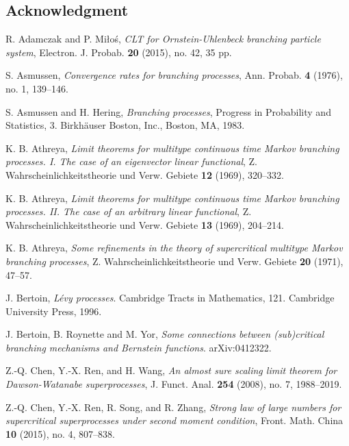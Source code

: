 \documentclass[12pt,a4paper]{amsart}
\theoremstyle{plain}
\theoremstyle{definition}
\numberwithin{equation}{section}
\begin{document}
\subsection*{Acknowledgment}


\begin{thebibliography}{10}

  R. Adamczak and P. Mi{\l}o\'{s}, \emph{C{LT} for {O}rnstein-{U}hlenbeck branching particle system},
  Electron. J. Probab. \textbf{20} (2015), no. 42, 35 pp.

  S. Asmussen, \emph{Convergence rates for branching processes},
  Ann. Probab.  \textbf{4} (1976), no. 1, 139--146.

  S. Asmussen and H. Hering, \emph{Branching processes},
  Progress in Probability and Statistics, 3. Birkh\"{a}user Boston, Inc., Boston, MA, 1983.

  K. B. Athreya,
  \emph{Limit theorems for multitype continuous time {M}arkov branching processes. {I}. {T}he case of an eigenvector linear functional},
  Z. Wahrscheinlichkeitstheorie und Verw. Gebiete \textbf{12} (1969), 320--332.

  K. B. Athreya,
  \emph{Limit theorems for multitype continuous time {M}arkov branching processes. {II}. {T}he case of an arbitrary linear functional},
  Z. Wahrscheinlichkeitstheorie und Verw. Gebiete \textbf{13} (1969), 204--214.

  K. B. Athreya,
  \emph{Some refinements in the theory of supercritical multitype {M}arkov branching processes},
  Z. Wahrscheinlichkeitstheorie und Verw. Gebiete \textbf{20} (1971), 47--57.


J. Bertoin,
\emph{L\'evy processes}.
Cambridge Tracts in Mathematics, 121. Cambridge
University Press, 1996.

J. Bertoin, B. Roynette and M. Yor,
\emph{Some connections between (sub)critical branching mechanisms and Bernstein functions}.
arXiv:0412322.


  Z.-Q. Chen, Y.-X. Ren, and H. Wang,
  \emph{An almost sure scaling limit theorem for {D}awson-{W}atanabe superprocesses},
  J. Funct. Anal. \textbf{254} (2008), no. 7, 1988--2019.

   Z.-Q. Chen, Y.-X. Ren, R. Song, and R. Zhang,
   \emph{Strong law of large numbers for supercritical superprocesses under second moment condition},
   Front. Math. China \textbf{10} (2015), no. 4, 807--838.


\end{thebibliography}
\end{document}
